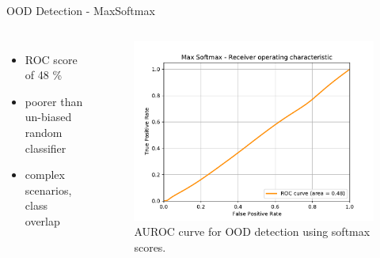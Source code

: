 \documentclass[10pt, aspectratio=169]{beamer}
\begin{document}
\begin{frame}{OOD Detection - MaxSoftmax}
    \begin{columns}
            \begin{itemize}
                \item ROC score of 48 \%
                \item poorer than un-biased random classifier
                \item complex scenarios, class overlap
            \end{itemize}
            \begin{figure}[!ht]
                \centering
                \includegraphics[scale=0.45]{images/Max Softmax_ROC.pdf}
                \caption[SSD framework]{AUROC curve for OOD detection using softmax scores.}
            \end{figure}
    \end{columns}
\end{frame}
\end{document}
